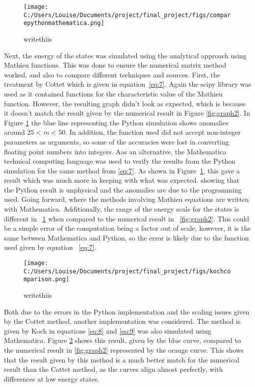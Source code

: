 \documentclass[11pt]{article}
\begin{document}
\begin{figure}[ht]
\centering
\texttt{[image: C:/Users/Louise/Documents/project/final\_project/figs/comparepythonmathematica.png]}
\caption{writethiis}
\label{fig:graph3}
\end{figure}
Next, the energy of the states was simulated using the analytical approach using Mathieu functions. This was done to ensure the numerical matrix method worked, and also to compare different techniques and sources. First, the treatment by Cottet which is given in equation~\ref{eq:7}. Again the scipy library was used as it contained functions for the characteristic value of the Mathieu function. However, the resulting graph didn't look as expected, which is because it doesn't match the result given by the numerical result in Figure \ref{fig:graph2}. In Figure \ref{fig:graph3} the blue line representing the Python simulation shows anomalies around $25 < m < 50$. In addition, the function used did not accept non-integer parameters as arguments, so some of the accuracies were lost in converting floating point numbers into integers. Aas an alternative, the Mathematica technical computing language was used to verify the results from the Python simulation for the same method from \ref{eq:7}. As shown in Figure~\ref{fig:graph3}, this gave a result which was much more in keeping with what was expected. showing that the Python result is unphysical and the anomalies are due to the programming used. Going forward, where the methods involving Mathieu equations are written with Mathematica.
Additionally, the range of the energy scale for the states is different in ~\ref{fig:graph3} when compared to the numerical result in ~\ref{fig:graph2}. This could be a simple error of the computation being a factor out of scale, however, it is the same between Mathematica and Python, so the error is likely due to the function used given by equation  ~\ref{eq:7}.
\begin{figure}[ht]
\centering
\texttt{[image: C:/Users/Louise/Documents/project/final\_project/figs/kochcomparison.png]}
\caption{writethiis}
\label{fig:graph4}
\end{figure}
Both due to the errors in the Python implementation and the scaling issues given by the Cottet method, another implementation was considered. The method is given by Koch in equations \ref{eq:8} and \ref{eq:9} was also simulated using Mathematica. Figure \ref{fig:graph4} shows this result, given by the blue curve, compared to the numerical result in \ref{fig:graph2} represented by the orange curve. This shows that the result given by this method is a much better match for the numerical result than the Cottet method, as the curves align almost perfectly, with differences at low energy states.
\end{document}
